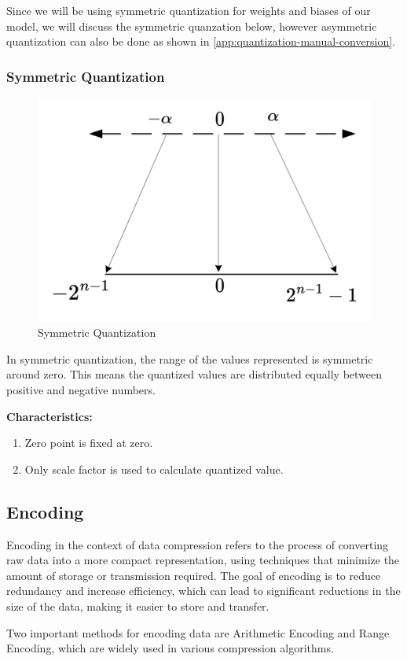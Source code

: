     Since we will be using symmetric quantization for weights and biases of our model, we will discuss the symmetric quanzation below, however asymmetric quantization can also be done as shown in \autoref{app:quantization-manual-conversion}.
    \subsubsection{Symmetric Quantization} 
    \begin{figure}[H]
        \centering
        \includegraphics[width=0.7\linewidth]{assets/quantization/Symmetric_Qfigure.png}
        \caption{Symmetric Quantization}
        \label{fig:Symmetric_Qfigure}
    \end{figure}
    In symmetric quantization, the range of the values represented is symmetric around zero. This means the quantized values are distributed equally between positive and negative numbers.

    \textbf{Characteristics:}
    \begin{enumerate}
        \item Zero point is fixed at zero.
        \item Only scale factor is used to calculate quantized value.
    \end{enumerate}

    \subsection{Encoding}
    Encoding in the context of data compression refers to the process of converting raw data into a more compact representation, using techniques that minimize the amount of storage or transmission required. The goal of encoding is to reduce redundancy and increase efficiency, which can lead to significant reductions in the size of the data, making it easier to store and transfer.

    Two important methods for encoding data are Arithmetic Encoding and Range Encoding, which are widely used in various compression algorithms.

